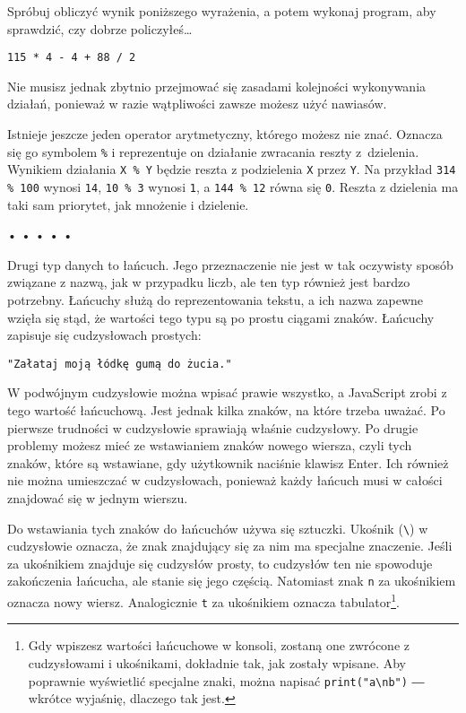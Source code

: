     
Spróbuj obliczyć wynik poniższego wyrażenia, a potem wykonaj program, aby sprawdzić, czy dobrze policzyłeś…

\begin{verbatim} 
115 * 4 - 4 + 88 / 2
\end{verbatim}
    
Nie musisz jednak zbytnio przejmować się zasadami kolejności wykonywania działań, ponieważ w razie wątpliwości zawsze możesz użyć nawiasów.

    
Istnieje jeszcze jeden operator arytmetyczny, którego możesz nie znać. Oznacza się go symbolem \texttt{\%}\index{\%} i reprezentuje on działanie zwracania reszty z~dzielenia. Wynikiem działania \texttt{X \% Y} będzie reszta z podzielenia \texttt{X} przez \texttt{Y}. Na przykład \texttt{314 \% 100} wynosi \texttt{14}, \texttt{10 \% 3} wynosi \texttt{1}, a \texttt{144 \% 12} równa się \texttt{0}. Reszta z dzielenia ma taki sam priorytet, jak mnożenie i dzielenie.

  
\begin{center}
• • • • •
\end{center}
  
    
Drugi typ danych to łańcuch. Jego przeznaczenie nie jest w tak oczywisty sposób związane z nazwą, jak w przypadku liczb, ale ten typ również jest bardzo potrzebny. Łańcuchy służą do reprezentowania tekstu, a ich nazwa zapewne wzięła się stąd, że wartości tego typu są po prostu ciągami znaków. Łańcuchy zapisuje się cudzysłowach prostych:

\begin{verbatim} 
"Załataj moją łódkę gumą do żucia."
\end{verbatim}
    
W podwójnym cudzysłowie można wpisać prawie wszystko, a JavaScript zrobi z tego wartość łańcuchową. Jest jednak kilka znaków, na które trzeba uważać. Po pierwsze trudności w cudzysłowie sprawiają właśnie cudzysłowy. Po drugie problemy możesz mieć ze wstawianiem znaków nowego wiersza, czyli tych znaków, które są wstawiane, gdy użytkownik naciśnie klawisz Enter. Ich również nie można umieszczać w cudzysłowach, ponieważ każdy łańcuch musi w całości znajdować się w jednym wierszu.

    
Do wstawiania tych znaków do łańcuchów używa się sztuczki. Ukośnik (\texttt{\textbackslash}) w cudzysłowie oznacza, że znak znajdujący się za nim ma specjalne znaczenie. Jeśli za ukośnikiem znajduje się cudzysłów prosty, to cudzysłów ten nie spowoduje zakończenia łańcucha, ale stanie się jego częścią. Natomiast znak \texttt{n} za ukośnikiem oznacza nowy wiersz. Analogicznie \texttt{t} za ukośnikiem oznacza tabulator\footnote{Gdy wpiszesz wartości łańcuchowe w konsoli, zostaną one zwrócone z cudzysłowami i ukośnikami, dokładnie tak, jak zostały wpisane. Aby poprawnie wyświetlić specjalne znaki, można napisać \texttt{print("a\textbackslash nb")} ― wkrótce wyjaśnię, dlaczego tak jest.}.

